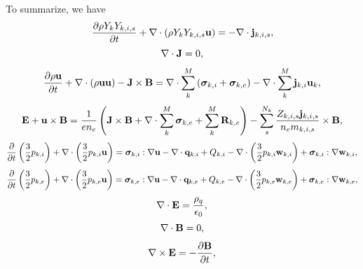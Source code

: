 \documentclass[a4paper,11pt]{report}
\begin{document}
To summarize, we have
\begin{equation}
    \label{eq:sf_mm_ms_ni}
    \frac{\partial \rho Y_k Y_{k,i,s}}{\partial t} + \nabla \cdot \left( \rho Y_k Y_{k,i,s} \mathbf{u} \right) = -\nabla \cdot \mathbf{j}_{k,i,s},
\end{equation}
\begin{equation}
    \label{eq:sf_mm_ms_ne}
    \nabla \cdot \mathbf{J} = 0,
\end{equation}
\begin{equation}
    \label{eq:sf_mm_ms_ui}
    \frac{\partial \rho \mathbf{u}}{\partial t} + \nabla \cdot \left( \rho \mathbf{u} \mathbf{u} \right) - \mathbf{J} \times \mathbf{B} = \nabla \cdot \sum_k^M \left( \bm \sigma_{k,i} + \bm \sigma_{k,e} \right) - \nabla \cdot \sum_k^M \mathbf{j}_{k,i} \mathbf{u}_{k},
\end{equation}
\begin{equation}
    \label{eq:sf_mm_ms_ue}
    \mathbf{E} + \mathbf{u} \times \mathbf{B} = \frac{1}{e n_e} \left( \mathbf{J} \times \mathbf{B} + \nabla \cdot \sum_k^M \bm \sigma_{k,e} + \sum_k^M \mathbf{R}_{k,e} \right) - \sum_s^{N_k} \frac{Z_{k,i,s} \mathbf{j}_{k,i,s}}{n_e m_{k,i,s}} \times \mathbf{B},
\end{equation}
\begin{equation}
    \label{eq:sf_mm_ms_iei}
    \frac{\partial}{\partial t} \left( \frac{3}{2} p_{k,i} \right) + \nabla \cdot \left( \frac{3}{2} p_{k,i} \mathbf{u} \right) = \bm \sigma_{k,i} : \nabla \mathbf{u} - \nabla \cdot \mathbf{q}_{k,i} + Q_{k,i} - \nabla \cdot \left( \frac{3}{2} p_{k,i} \mathbf{w}_{k,i} \right) + \bm \sigma_{k,i} : \nabla \mathbf{w}_{k,i},
\end{equation}
\begin{equation}
    \label{eq:sf_mm_ms_iee}
    \frac{\partial}{\partial t} \left( \frac{3}{2} p_{k,e} \right) + \nabla \cdot \left( \frac{3}{2} p_{k,e} \mathbf{u} \right) = \bm \sigma_{k,e} : \nabla \mathbf{u} - \nabla \cdot \mathbf{q}_{k,e} + Q_{k,e} - \nabla \cdot \left( \frac{3}{2} p_{k,e} \mathbf{w}_{k,e} \right) + \bm \sigma_{k,e} : \nabla \mathbf{w}_{k,e},
\end{equation}
\begin{equation}
    \label{eq:sf_mm_ms_maxwell_3}
    \nabla \cdot \mathbf{E} = \frac{\rho_q}{\epsilon_0},
\end{equation}
\begin{equation}
    \label{eq:sf_mm_ms_maxwell_4}
    \nabla \cdot \mathbf{B} = 0,
\end{equation}
\begin{equation}
    \label{eq:sf_mm_ms_maxwell_1}
    \nabla \times \mathbf{E} = -\frac{ \partial \mathbf{B}}{\partial t},
\end{equation}
\end{document}
